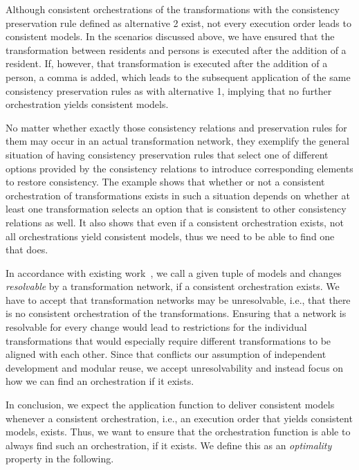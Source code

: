 Although consistent orchestrations of the transformations with the consistency preservation rule defined as alternative 2 exist, not every execution order leads to consistent models.
In the scenarios discussed above, we have ensured that the transformation between residents and persons is executed after the addition of a resident.
If, however, that transformation is executed after the addition of a person, a comma is added, which leads to the subsequent application of the same consistency preservation rules as with alternative 1, implying that no further orchestration yields consistent models.

No matter whether exactly those consistency relations and preservation rules for them may occur in an actual transformation network, they exemplify the general situation of having consistency preservation rules that select one of different options provided by the consistency relations to introduce corresponding elements to restore consistency.
The example shows that whether or not a consistent orchestration of transformations exists in such a situation depends on whether at least one transformation selects an option that is consistent to other consistency relations as well.
It also shows that even if a consistent orchestration exists, not all orchestrations yield consistent models, thus we need to be able to find one that does.

In accordance with existing work~\cite{stevens2020BidirectionalTransformationLarge-SoSym}, we call a given tuple of models and changes \emph{resolvable} by a transformation network, if a consistent orchestration exists.
%
We have to accept that transformation networks may be unresolvable, i.e., that there is no consistent orchestration of the transformations.
Ensuring that a network is resolvable for every change would lead to restrictions for the individual transformations that would especially require different transformations to be aligned with each other.
Since that conflicts our assumption of independent development and modular reuse, we accept unresolvability and instead focus on how we can find an orchestration if it exists. 

In conclusion, we expect the application function to deliver consistent models whenever a consistent orchestration, i.e., an execution order that yields consistent models, exists.
Thus, we want to ensure that the orchestration function is able to always find such an orchestration, if it exists.
We define this as an \emph{optimality} property in the following.

